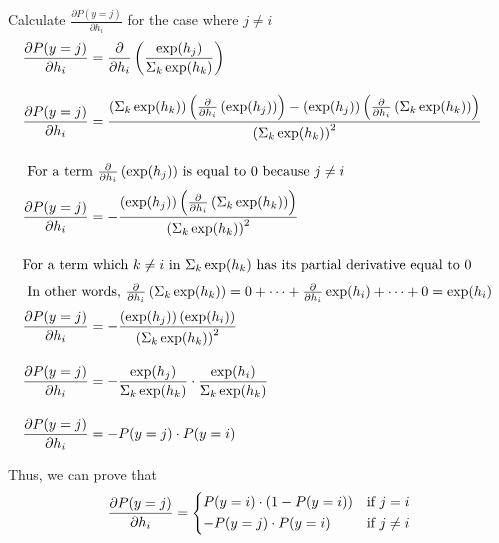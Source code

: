 \documentclass[12pt, a4paper]{article}
\begin{document}
                \noindent Calculate $\frac{\partial P(y=j)}{\partial h_i}$ for the case where $j \neq i$
                \begin{align*}
                    \frac{\partial P(y=j)}{\partial h_i} &= \frac{\partial}{\partial h_i} \left( \frac{\exp(h_j)}{\Sigma_k \exp(h_k)} \right) \\[1em]
                    \frac{\partial P(y=j)}{\partial h_i} &= \frac{
                        \left( \Sigma_k \exp(h_k)  \right) \left( \frac{\partial}{\partial h_i} \left( \exp(h_j) \right) \right)
                        - \left( \exp(h_j) \right) \left( \frac{\partial}{\partial h_i} \left( \Sigma_k \exp(h_k) \right) \right)
                    }
                    {{\left( \Sigma_k \exp(h_k) \right)}^{2}} \\[1em]
                    \intertext{
                        For a term $\frac{\partial}{\partial h_i} \left( \exp(h_j) \right)$ is equal to 0 because $j \neq i$
                    }
                    \frac{\partial P(y=j)}{\partial h_i} &= - \frac{
                        \left( \exp(h_j) \right)
                        \left( \frac{\partial}{\partial h_i} \left( \Sigma_k \exp(h_k) \right) \right)
                    }
                    {{\left( \Sigma_k \exp(h_k) \right)}^{2}} \\[1em]
                    \intertext{For a term which $k \neq i$ in $\Sigma_k \exp(h_k)$ has its partial derivative equal to 0}
                    \intertext{
                        In other words, $\frac{\partial}{\partial h_i} \left( \Sigma_k \exp(h_k) \right)
                        = 0 + \dots + \frac{\partial}{\partial h_i} \exp(h_i) + \dots + 0
                        = \exp(h_i)$
                    }
                    \frac{\partial P(y=j)}{\partial h_i} &= - \frac{
                        \left( \exp(h_j) \right) \left( \exp(h_i) \right)
                    }
                    {{\left( \Sigma_k \exp(h_k) \right)}^{2}} \\[1em]
                    \frac{\partial P(y=j)}{\partial h_i} &= - \frac{\exp(h_j)}{\Sigma_k \exp(h_k)}
                    \cdot \frac{\exp(h_i)}{\Sigma_k \exp(h_k)} \\[1em]
                    \frac{\partial P(y=j)}{\partial h_i} &= -P(y=j) \cdot P(y=i)
                \end{align*}

                Thus, we can prove that
                \begin{align*}
                    \frac{\partial P(y=j)}{\partial h_i} =
                    \begin{dcases}
                        P(y=i) \cdot (1 - P(y=i)) & \text{if } j = i \\
                        -P(y=j) \cdot P(y=i) & \text{if } j \neq i
                    \end{dcases}
                \end{align*}
\end{document}
